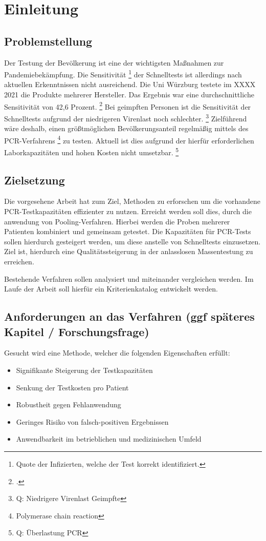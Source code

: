 
\chapter{Einleitung}
\section{Problemstellung}
Der Testung der Bevölkerung ist eine der wichtigsten Maßnahmen zur Pandemiebekämpfung.
Die Sensitivität
\footnote{Quote der Infizierten, welche der Test korrekt identifiziert.}
der Schnelltests ist allerdings nach aktuellen Erkenntnissen nicht ausreichend.
Die Uni Würzburg testete im XXXX 2021 die Produkte mehrerer Hersteller.
Das Ergebnis war eine durchschnittliche Sensitivität von 42,6 Prozent.
\footcite{Wuerzburg-Studie}
Bei geimpften Personen ist die Sensitivität der Schnelltests aufgrund der niedrigeren Virenlast noch schlechter.
 \footnote{Q: Niedrigere Virenlast Geimpfte}
Zielführend wäre deshalb, einen größtmöglichen Bevölkerungsanteil regelmäßig mittels des PCR-Verfahrens
\footnote{\acf{Polymerase chain reaction}}
 zu testen.
Aktuell ist dies aufgrund der hierfür erforderlichen Laborkapazitäten und hohen Kosten nicht umsetzbar.
 \footnote{Q: Überlastung PCR}

\section{Zielsetzung}
Die vorgesehene Arbeit hat zum Ziel, Methoden zu erforschen um die vorhandene PCR-Testkapazitäten effizienter zu nutzen.
Erreicht werden soll dies, durch die anwendung von Pooling-Verfahren.
Hierbei werden die Proben mehrerer Patienten kombiniert und gemeinsam getestet.
Die Kapazitäten für PCR-Tests sollen hierdurch gesteigert werden, um diese anstelle von Schnelltests einzusetzen.
Ziel ist, hierdurch eine Qualitätssteigerung in der anlasslosen Massentestung zu erreichen.

Bestehende Verfahren sollen analysiert und miteinander vergleichen werden. 
Im Laufe der Arbeit soll hierfür ein Kriterienkatalog entwickelt werden.


\section{Anforderungen an das Verfahren (ggf späteres Kapitel / Forschungsfrage)}
Gesucht wird eine Methode, welcher die folgenden Eigenschaften erfüllt:

\begin{itemize}
\item Signifikante Steigerung der Testkapazitäten
\item Senkung der Testkosten pro Patient
\item Robustheit gegen Fehlanwendung
\item Geringes Risiko von falsch-positiven Ergebnissen
\item Anwendbarkeit im betrieblichen und medizinischen Umfeld
\end{itemize}

